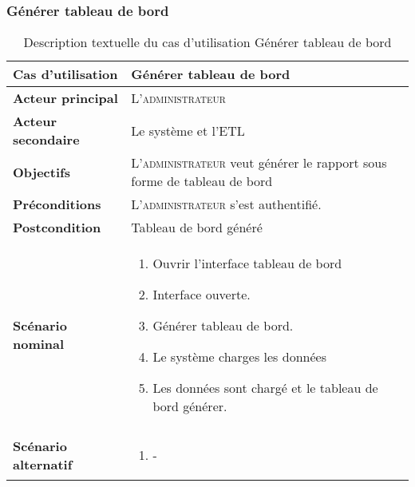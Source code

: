         \subsubsection[Générer tableau de bord]{Générer tableau de bord}
        \begin{longtable}{p{4cm} p{9cm}}
            \caption{Description textuelle du cas d’utilisation Générer tableau de bord}
            \label{table:usecaseDashboard}
            \\\hline\hline
                \textbf{Cas d’utilisation} & \textbf{Générer tableau de bord}
            \\\hline\hline
                    \textbf{Acteur principal} & L’\textsc{administrateur}
                \\
                    \textbf{Acteur secondaire} & Le système et l’ETL
                \\
                    \textbf{Objectifs} & L’\textsc{administrateur} veut générer le rapport sous forme de tableau de bord
                \\
                    \textbf{Préconditions} & L’\textsc{administrateur} s’est authentifié.
                \\
                    \textbf{Postcondition} & Tableau de bord généré
                \\
                \textbf{Scénario nominal} &
                    \begin{enumerate}[leftmargin=*]
                        \item Ouvrir l’interface tableau de bord
                        \item Interface ouverte.
                        \item Générer tableau de bord.
                        \item Le système charges les données
                        \item Les données sont chargé et le tableau de bord générer.
                    \end{enumerate}
                \\
                \textbf{Scénario alternatif} &
                    \begin{enumerate}[leftmargin=*]
                        \item -
                    \end{enumerate}
            \\\bottomrule
        \end{longtable}

